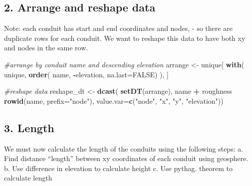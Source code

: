 \documentclass[]{article}
\newenvironment{Shaded}{\begin{snugshade}}{\end{snugshade}}
\newcommand{\CommentTok}[1]{\textcolor[rgb]{0.56,0.35,0.01}{\textit{#1}}}
\newcommand{\DataTypeTok}[1]{\textcolor[rgb]{0.13,0.29,0.53}{#1}}
\newcommand{\KeywordTok}[1]{\textcolor[rgb]{0.13,0.29,0.53}{\textbf{#1}}}
\newcommand{\NormalTok}[1]{#1}
\newcommand{\OperatorTok}[1]{\textcolor[rgb]{0.81,0.36,0.00}{\textbf{#1}}}
\newcommand{\OtherTok}[1]{\textcolor[rgb]{0.56,0.35,0.01}{#1}}
\newcommand{\StringTok}[1]{\textcolor[rgb]{0.31,0.60,0.02}{#1}}
\begin{document}
\hypertarget{arrange-and-reshape-data}{%
\subsection{2. Arrange and reshape
data}\label{arrange-and-reshape-data}}

Note: each conduit has start and end coordinates and nodes, - so there
are duplicate rows for each conduit. We want to reshape this data to
have both xy and nodes in the same row.

\begin{Shaded}
\begin{Highlighting}[]
\CommentTok{#arrange by conduit name and descending elevation}
\NormalTok{arrange <-}\StringTok{ }\NormalTok{unique[}
  \KeywordTok{with}\NormalTok{(}
\NormalTok{  unique, }\KeywordTok{order}\NormalTok{(}
\NormalTok{    name, }
    \OperatorTok{-}\NormalTok{elevation, }
    \DataTypeTok{na.last=}\OtherTok{FALSE}\NormalTok{)}
\NormalTok{  ),}
\NormalTok{  ]}

\CommentTok{#reshape data}
\NormalTok{reshape_dt <-}\StringTok{ }\KeywordTok{dcast}\NormalTok{(}
  \KeywordTok{setDT}\NormalTok{(arrange), }
\NormalTok{  name }\OperatorTok{+}\StringTok{ }\NormalTok{roughness }\OperatorTok{~}\StringTok{ }\KeywordTok{rowid}\NormalTok{(name, }\DataTypeTok{prefix=}\StringTok{"node"}\NormalTok{), }
  \DataTypeTok{value.var=}\KeywordTok{c}\NormalTok{(}\StringTok{"node"}\NormalTok{, }\StringTok{"x"}\NormalTok{, }\StringTok{"y"}\NormalTok{, }\StringTok{"elevation"}\NormalTok{))}
\end{Highlighting}
\end{Shaded}

\hypertarget{length}{%
\subsection{3. Length}\label{length}}

We must now calculate the length of the conduits using the following
steps: a. Find distance ``length'' between xy coordinates of each
conduit using geosphere. b. Use difference in elevation to calculate
height c. Use pythag. theorem to calculate length
\end{document}
